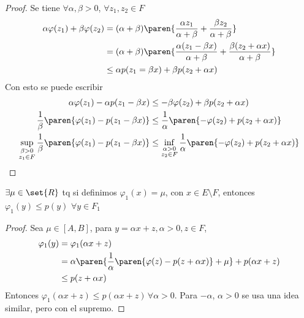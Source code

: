 \documentclass{notetaking}
\begin{document}
\begin{proof}
    Se tiene \(\forall\alpha,\beta>0\), \(\forall z_1,z_2\in F\)
    \begin{align*}
        \alpha\varphi(z_1)+\beta\varphi(z_2) & = (\alpha+\beta)\paren{\frac{\alpha z_1}{\alpha+\beta}+\frac{\beta z_2}{\alpha+\beta}}                      \\
                                             & = (\alpha+\beta)\paren{\frac{\alpha (z_1-\beta x)}{\alpha+\beta}+\frac{\beta (z_2+\alpha x)}{\alpha+\beta}} \\
                                             & \leq \alpha p(z_1=\beta x)+\beta p(z_2+\alpha x)
    \end{align*}
    Con esto se puede escribir
    \begin{align*}
        \alpha\varphi(z_1)-\alpha p(z_1-\beta x)       & \leq-\beta\varphi(z_2)+\beta p(z_2+\alpha x)           \\
        \frac1\beta\paren{\varphi(z_1)-p(z_1-\beta x)} & \leq\frac1\alpha\paren{-\varphi(z_2)+ p(z_2+\alpha x)} \\
        \sup_{\substack{\beta>0                                                                                 \\z_1\in F}}\frac1\beta\paren{\varphi(z_1)-p(z_1-\beta x)}&\leq\inf_{\substack{\alpha>0\\z_2\in F}}\frac1\alpha\paren{-\varphi(z_2)+ p(z_2+\alpha x)}
    \end{align*}
\end{proof}
\begin{cor}
    \(\exists\mu\in\set{R}\) tq si definimos \(\varphi_1(x)=\mu\), con \(x\in E\setminus F\), entonces \(\varphi_1(y)\leq p(y)\) \(\forall y\in F_1\)
\end{cor}
\begin{proof}
    Sea \(\mu\in[A,B]\), para \(y=\alpha x+z,\alpha>0,z\in F\),
    \begin{align*}
        \varphi_1(y) & =\varphi_1(\alpha x+z)                                                        \\
                     & =\alpha\paren{\frac1\alpha\paren{\varphi(z)-p(z+\alpha x)}+\mu}+p(\alpha x+z) \\
                     & \leq p(z+\alpha x)
    \end{align*}
    Entonces \(\varphi_1(\alpha x+z)\leq p(\alpha x+z)\, \forall \alpha>0\). Para \(-\alpha\), \(\alpha>0\) se usa una idea similar, pero con el supremo.
\end{proof}
\end{document}
